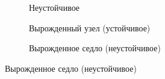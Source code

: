 \begin{figure}[H]
  \centering

  \begin{subfigure}[b]{0.3\textwidth}
    
    \caption{Неустойчивое}

  \end{subfigure}
  \qquad
  \begin{subfigure}[b]{0.3\textwidth}

    
    \caption{Вырожденный узел (устойчивое)}

  \end{subfigure}
  \qquad
  \begin{subfigure}[b]{0.3\textwidth}

    
    \caption{Вырожденное седло (неустойчивое)}

  \end{subfigure}
\end{figure}